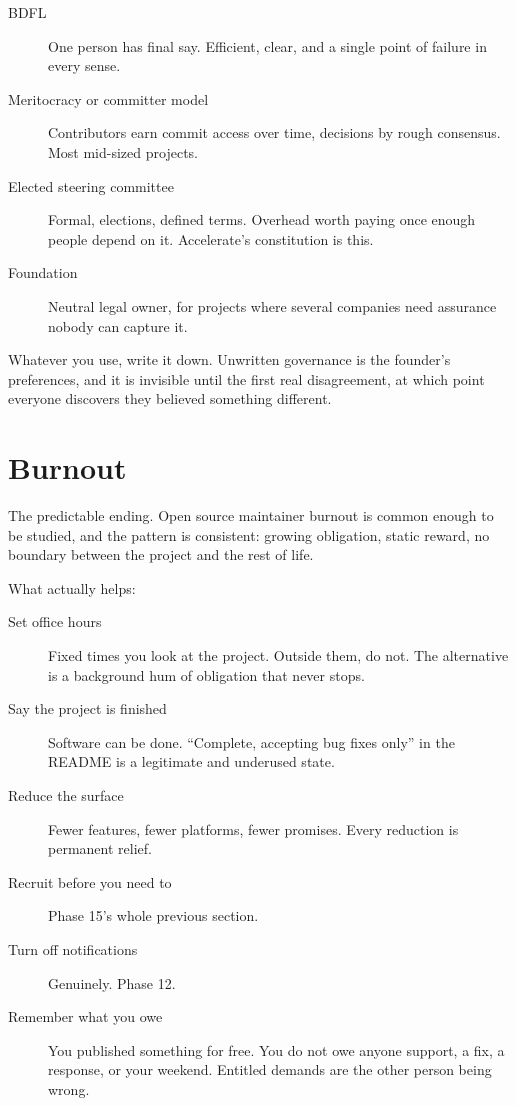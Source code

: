 \documentclass[11pt]{article}
\begin{document}
\begin{description}
  \item[BDFL] One person has final say. Efficient, clear, and a single point of
    failure in every sense.
  \item[Meritocracy or committer model] Contributors earn commit access over time,
    decisions by rough consensus. Most mid-sized projects.
  \item[Elected steering committee] Formal, elections, defined terms. Overhead worth
    paying once enough people depend on it. Accelerate's constitution is this.
  \item[Foundation] Neutral legal owner, for projects where several companies need
    assurance nobody can capture it.
\end{description}

Whatever you use, write it down. Unwritten governance is the founder's preferences,
and it is invisible until the first real disagreement, at which point everyone
discovers they believed something different.

\section{Burnout}

The predictable ending. Open source maintainer burnout is common enough to be
studied, and the pattern is consistent: growing obligation, static reward, no
boundary between the project and the rest of life.

What actually helps:

\begin{description}
  \item[Set office hours] Fixed times you look at the project. Outside them, do not.
    The alternative is a background hum of obligation that never stops.
  \item[Say the project is finished] Software can be done. ``Complete, accepting bug
    fixes only'' in the README is a legitimate and underused state.
  \item[Reduce the surface] Fewer features, fewer platforms, fewer promises. Every
    reduction is permanent relief.
  \item[Recruit before you need to] Phase 15's whole previous section.
  \item[Turn off notifications] Genuinely. Phase 12.
  \item[Remember what you owe] You published something for free. You do not owe
    anyone support, a fix, a response, or your weekend. Entitled demands are the
    other person being wrong.
\end{description}
\end{document}
